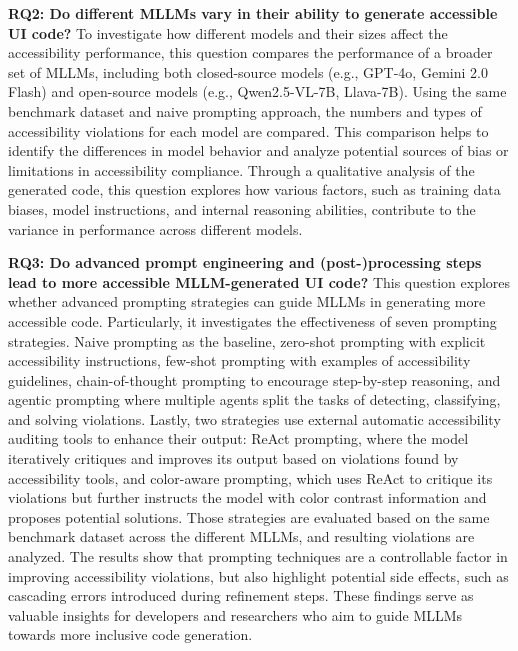 \textbf{RQ2: Do different MLLMs vary in their ability to generate accessible UI code?}
To investigate how different models and their sizes affect the 
accessibility performance, this question compares the performance of 
a broader set of MLLMs, including both closed-source models
(e.g., GPT-4o, Gemini 2.0 Flash) and open-source
models (e.g., Qwen2.5-VL-7B, Llava-7B). Using the same benchmark dataset and 
naive prompting approach, the numbers and types of accessibility 
violations for each model are compared. This comparison helps to
identify the differences in model behavior and analyze potential 
sources of bias or limitations in accessibility compliance. 
Through a qualitative analysis of the generated code, this question 
explores how various factors, such as training data biases, model instructions, and
internal reasoning abilities, contribute to the variance in
performance across different models.
\newline

\textbf{RQ3: Do advanced prompt engineering and (post-)processing steps lead to more accessible MLLM-generated UI
code?}
This question explores whether advanced prompting strategies can guide 
MLLMs in generating more accessible code. Particularly, it investigates
the effectiveness of seven prompting strategies. Naive prompting as the
baseline, zero-shot prompting with explicit accessibility instructions,
few-shot prompting with examples of accessibility guidelines,
chain-of-thought prompting to encourage step-by-step reasoning, and
agentic prompting where multiple agents split the tasks of
detecting, classifying, and solving violations. 
Lastly, two strategies use external automatic accessibility auditing tools to enhance their output:
ReAct prompting, where the model iteratively critiques and improves 
its output based on violations found by accessibility tools, 
and color-aware prompting, which uses ReAct to critique its violations but 
further instructs the model with color contrast information and proposes
potential solutions. Those strategies are evaluated based on the same 
benchmark dataset across the different MLLMs, and resulting violations 
are analyzed. 
The results show that prompting techniques are a controllable
factor in improving accessibility violations, but also highlight
potential side effects, such as cascading
errors introduced during refinement steps.
These findings serve as valuable insights for developers and researchers
who aim to guide MLLMs towards more inclusive code generation.\newline

